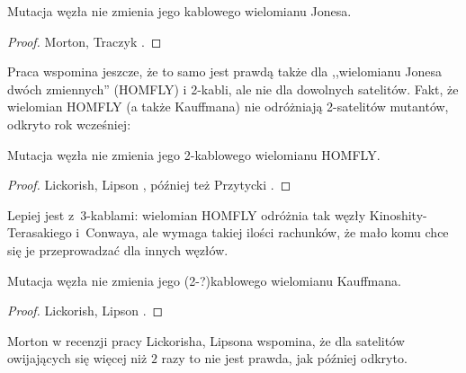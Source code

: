 \begin{proposition}
    Mutacja węzła nie zmienia jego kablowego wielomianu Jonesa.
%
\end{proposition}

\begin{proof}
%
%
    Morton, Traczyk \cite{traczyk1988}.
\end{proof}

Praca \cite{traczyk1988} wspomina jeszcze, że to samo jest prawdą także dla ,,wielomianu Jonesa dwóch zmiennych'' (HOMFLY) i 2-kabli, ale nie dla dowolnych satelitów.
Fakt, że wielomian HOMFLY (a także Kauffmana) nie odróżniają 2-satelitów mutantów, odkryto rok wcześniej:

\begin{proposition}
\label{mutants_and_homfly}%
%
    Mutacja węzła nie zmienia jego 2-kablowego wielomianu HOMFLY.
\end{proposition}

\begin{proof}
%
%
%
    Lickorish, Lipson \cite{lipson1987}, później też Przytycki \cite{przytycki1989}.
\end{proof}

Lepiej jest z~3-kablami: wielomian HOMFLY odróżnia tak węzły Kinoshity-Terasakiego i~Conwaya, ale wymaga takiej ilości rachunków, że mało komu chce się je przeprowadzać dla innych węzłów.
%
%

\begin{proposition}
    Mutacja węzła nie zmienia jego (2-?)kablowego wielomianu Kauffmana.
%
%
\end{proposition}

\begin{proof}
%
%
    Lickorish, Lipson \cite{lipson1987}.
\end{proof}

Morton w recenzji pracy Lickorisha, Lipsona wspomina, że dla satelitów owijających się więcej niż $2$ razy to nie jest prawda, jak później odkryto.

